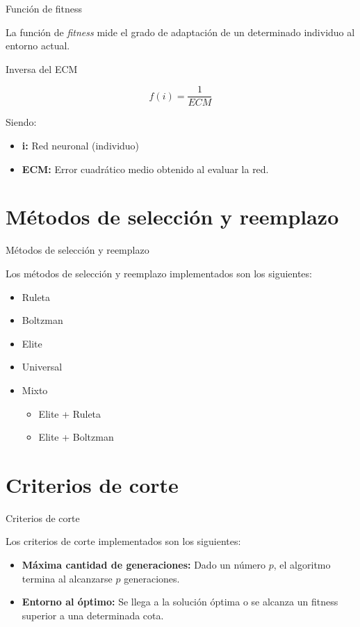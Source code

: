 \documentclass{beamer}
\begin{document}
\begin{frame}{Función de fitness}


\par La función de \textit{fitness} mide el grado de adaptación de un determinado individuo al entorno actual.

\begin{block}{Inversa del ECM}

\[
   f(i) = \frac{1}{ECM}
\]

Siendo:

\begin{itemize}
\item \textbf{i:} Red neuronal (individuo)
\item \textbf{ECM:} Error cuadrático medio obtenido al evaluar la red.
\end{itemize}
\end{block}


\end{frame}


\section{Métodos de selección y reemplazo}

\begin{frame}{Métodos de selección y reemplazo}
\par Los métodos de selección y reemplazo implementados son los siguientes:\\
\begin{itemize}
\item Ruleta
\item Boltzman
\item Elite
\item Universal
\item Mixto
\begin{itemize}
\item Elite + Ruleta
\item Elite + Boltzman
\end{itemize}
\end{itemize}
\end{frame}

\section{Criterios de corte}
\begin{frame}{Criterios de corte}

\par Los criterios de corte implementados son los siguientes:\\

\begin{itemize}
\item \textbf{Máxima cantidad de generaciones:} Dado un número $p$, el algoritmo termina al alcanzarse $p$ generaciones.
\item \textbf{Entorno al óptimo:} Se llega a la solución óptima o se alcanza un fitness superior a una determinada cota.
\end{itemize}
\end{frame}
\end{document}
